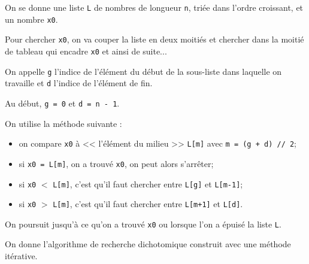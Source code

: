 %
%
%


On se donne une liste \texttt{L} de nombres de longueur \texttt{n}, {triée dans l'ordre croissant}, et un nombre \texttt{x0}. 

Pour chercher \texttt{x0}, on va couper la liste en deux moitiés et chercher dans la moitié de tableau qui encadre \texttt{x0} et ainsi de suite...

On appelle \texttt{g} l'indice de l'élément du début de la sous-liste dans laquelle on travaille et \texttt{d} l'indice de l'élément de fin.

Au début, \texttt{g = 0} et \texttt{d = n - 1}.

%

On utilise la méthode suivante :
\begin{itemize}
\item on compare \texttt{x0} à << l'élément du milieu >>  \texttt{L[m]} avec \texttt{m = (g + d) // 2};
\item si \texttt{x0 = L[m]}, on a trouvé \texttt{x0}, on peut alors s'arrêter;
\item si \texttt{x0} $<$ \texttt{L[m]}, c'est qu'il faut chercher entre \texttt{L[g]} et  \texttt{L[m-1]};%
\item si \texttt{x0} $>$ \texttt{L[m]}, c'est qu'il faut chercher  entre \texttt{L[m+1]} et \texttt{L[d]}.%
\end{itemize}

On poursuit jusqu'à ce qu'on a trouvé \texttt{x0} ou lorsque l'on a épuisé la liste \texttt{L}.

On donne l'algorithme de recherche dichotomique construit avec une méthode itérative.

